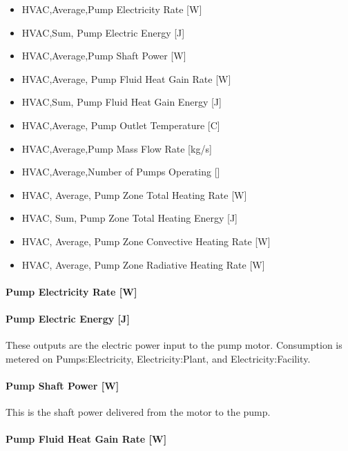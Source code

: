 \begin{itemize}
\item
  HVAC,Average,Pump Electricity Rate {[}W{]}
\item
  HVAC,Sum, Pump Electric Energy {[}J{]}
\item
  HVAC,Average,Pump Shaft Power {[}W{]}
\item
  HVAC,Average, Pump Fluid Heat Gain Rate {[}W{]}
\item
  HVAC,Sum, Pump Fluid Heat Gain Energy {[}J{]}
\item
  HVAC,Average, Pump Outlet Temperature {[}C{]}
\item
  HVAC,Average,Pump Mass Flow Rate {[}kg/s{]}
\item
  HVAC,Average,Number of Pumps Operating {[]}
\item
  HVAC, Average, Pump Zone Total Heating Rate {[}W{]}
\item
  HVAC, Sum, Pump Zone Total Heating Energy {[}J{]}
\item
  HVAC, Average, Pump Zone Convective Heating Rate {[}W{]}
\item
  HVAC, Average, Pump Zone Radiative Heating Rate {[}W{]}
\end{itemize}

\paragraph{Pump Electricity Rate {[}W{]}}\label{pump-electric-power-w-3}

\paragraph{Pump Electric Energy {[}J{]}}\label{pump-electric-energy-j-3}

These outputs are the electric power input to the pump motor. Consumption is metered on Pumps:Electricity, Electricity:Plant, and Electricity:Facility.

\paragraph{Pump Shaft Power {[}W{]}}\label{pump-shaft-power-w-3}

This is the shaft power delivered from the motor to the pump.

\paragraph{Pump Fluid Heat Gain Rate {[}W{]}}\label{pump-fluid-heat-gain-rate-w-3}


